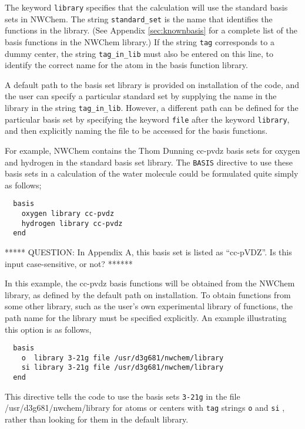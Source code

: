 The keyword \verb+library+ specifies that the calculation will use the 
standard basis sets in NWChem.  The string \verb+standard_set+ is the
name that identifies the functions in the library.  (See Appendix 
\ref{sec:knownbasis} for a complete list of the basis functions in the
NWChem library.)  If the string \verb+tag+ corresponds to
a dummy center, the string \verb+tag_in_lib+ must also be entered on
this line, to identify
the correct name for the atom in the basis function library.

A default path to the basis set library
is provided on installation of the code, and the user can specify a 
particular standard set by supplying the name in the library
in the string \verb+tag_in_lib+.  However, a different path can be defined
for the particular basis set by specifying the keyword \verb+file+ after
the keyword \verb+library+, and then explicitly naming the file to be
accessed for the basis functions.

For example, NWChem contains the Thom Dunning cc-pvdz basis sets for
oxygen and hydrogen in the standard basis set library.  The \verb+BASIS+
directive to use these basis sets in a calculation of the water molecule
could be formulated quite simply as follows;

\begin{verbatim}
  basis
    oxygen library cc-pvdz
    hydrogen library cc-pvdz
  end
\end{verbatim}

\Large
*****
QUESTION: In Appendix A, this basis set is listed as ``cc-pVDZ''.  Is
this input case-sensitive, or not?
******
\normalsize

In this example, the cc-pvdz basis functions will be obtained from the
NWChem library, as defined by the default path on installation.  To obtain
functions from some other library, such as the user's own experimental
library of functions, the path name for the library must be specified
explicitly.  An example illustrating this option is as follows,

\begin{verbatim}
  basis
    o  library 3-21g file /usr/d3g681/nwchem/library
    si library 3-21g file /usr/d3g681/nwchem/library
  end
\end{verbatim}

This directive tells the code to use the basis sets \verb+3-21g+ in the
file /usr/d3g681/nwchem/library for atoms  or centers with \verb+tag+ 
strings \verb+o+ and \verb+si+ , rather than looking for them in the
default library.

